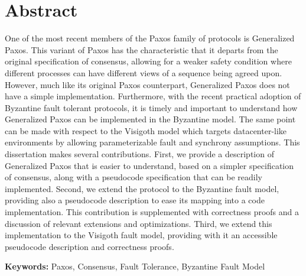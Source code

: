 
\section*{Abstract}


One of the most recent members of the Paxos family of
protocols is Generalized Paxos. This variant of Paxos has the characteristic that it departs from the original specification of consensus, allowing for a
weaker safety condition where different processes can have different views of a sequence being agreed upon. However, much like its original Paxos counterpart, Generalized Paxos does not have a simple implementation. Furthermore, with the recent practical adoption of Byzantine fault tolerant protocols, it is timely and important to understand how Generalized Paxos can be implemented in the Byzantine model. The same point can be made with respect to the Visigoth model which targets datacenter-like environments by allowing parameterizable fault and synchrony assumptions. This dissertation makes several contributions. First, we provide a description of Generalized Paxos that is easier to understand, based on a simpler specification of consensus, along with a pseudocode specification that can be readily implemented. Second, we extend the protocol to the Byzantine fault model, providing also a pseudocode description to ease its mapping into a code implementation. This contribution is supplemented  with correctness proofs and a discussion of relevant extensions and optimizations. Third, we extend this implementation to the Visigoth fault model, providing with it an accessible pseudocode description and correctness proofs. 

\vfill

\textbf{\Large Keywords:} Paxos, Consensus, Fault Tolerance, Byzantine Fault Model

